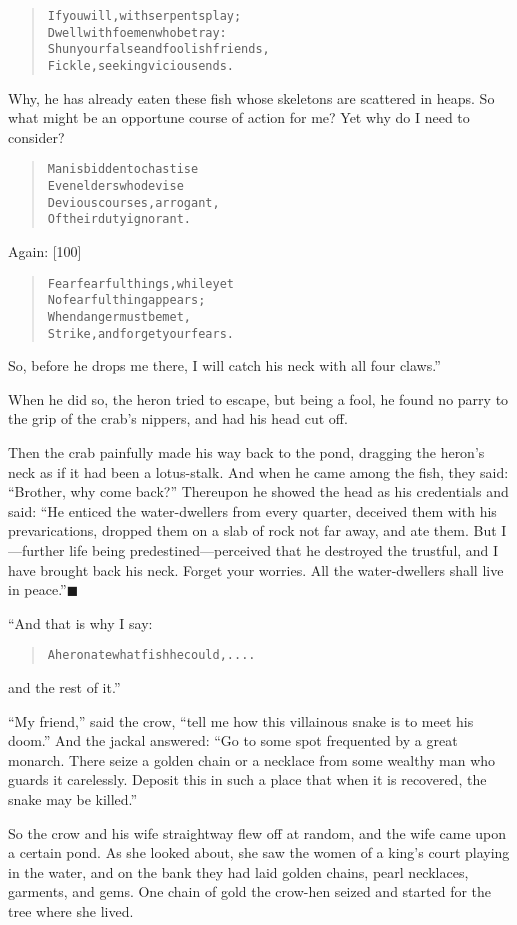 \documentclass[article, twoside, 14pt]{memoir}
\newcommand{\qed}{\hfill \ensuremath{\blacksquare}}
\renewenvironment{verbatim}{%
\begin{quote}%
\vskip -10pt%
\begin{alltt}\normalfont\large}{\end{alltt}%
\end{quote}%
\vskip -10pt
} %
\begin{document}
\begin{verbatim}
If you will, with serpents play;
Dwell with foemen who betray:
Shun your false and foolish friends,
Fickle, seeking vicious ends.
\end{verbatim}
Why, he has already eaten these fish whose skeletons are scattered
in heaps. So what might be an opportune course of action for me?
Yet why do I need to consider?

\begin{verbatim}
Man is bidden to chastise
Even elders who devise
Devious courses, arrogant,
Of their duty ignorant.
\end{verbatim}
Again: [100]

\begin{verbatim}
Fear fearful things, while yet
    No fearful thing appears;
When danger must be met,
    Strike, and forget your fears.
\end{verbatim}
So, before he drops me there, I will catch his neck with all four
claws.”

When he did so, the heron tried to escape, but being a fool, he
found no parry to the grip of the crab's nippers, and had his head
cut off.

Then the crab painfully made his way back to the pond, dragging the
heron's neck as if it had been a lotus-stalk. And when he came
among the fish, they said: ``Brother, why come back?'' Thereupon he
showed the head as his credentials and said:
``He enticed the water-dwellers from every quarter, deceived them with his prevarications, dropped them on a slab of rock not far away, and ate them. But I---further life being predestined---perceived that he destroyed the trustful, and I have brought back his neck. Forget your worries. All the water-dwellers shall live in peace.''\hyperref[s9]{\qed}

“And that is why I say:

\begin{verbatim}
A heron ate what fish he could, ....
\end{verbatim}
and the rest of it.”

``My friend,'' said the crow,
``tell me how this villainous snake is to meet his doom.'' And the
jackal answered:
``Go to some spot frequented by a great monarch. There seize a golden chain or a necklace from some wealthy man who guards it carelessly. Deposit this in such a place that when it is recovered, the snake may be killed.''

So the crow and his wife straightway flew off at random, and the
wife came upon a certain pond. As she looked about, she saw the
women of a king's court playing in the water, and on the bank they
had laid golden chains, pearl necklaces, garments, and gems. One
chain of gold the crow-hen seized and started for the tree where
she lived.
\end{document}
